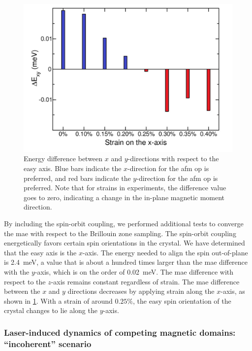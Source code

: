 \begin{figure}
\centering
\includegraphics[width=\textwidth]{./gfx/ch6/equilibriumtheory.pdf}
\caption[Energy difference between $x$ and $y$-directions with respect to the easy axis]{
\label{cmb-fig:equilibriumtheory}
Energy difference between $x$ and $y$-directions with respect to the easy axis.
Blue bars indicate the $x$-direction for the \gls{afm} \gls{op} is preferred, and red bars indicate the $y$-direction for the \gls{afm} \gls{op} is preferred.
Note that for strains in experiments, the difference value goes to zero, indicating a change in the in-plane magnetic moment direction.
}
\end{figure}

By including the spin-orbit coupling, we performed additional tests to converge the \gls{mae} with respect to the Brillouin zone sampling.
The spin-orbit coupling energetically favors certain spin orientations in the crystal.
We have determined that the  easy axis is the $x$-axis.
The energy needed to align the spin out-of-plane is \qty{2.4}{meV}, a value that is about a hundred times larger than the \gls{mae} difference with the $y$-axis, which is on the order of \qty{0.02}{meV}.
The \gls{mae} difference with respect  to the $z$-axis remains constant regardless of strain.
The \gls{mae} difference between the $x$ and $y$ directions decreases by applying strain along the $x$-axis, as shown in \cref{cmb-fig:equilibriumtheory}.
With a strain of around $0.25 \%$, the easy spin orientation of the crystal changes to lie along the $y$-axis.

\subsubsection{Laser-induced dynamics of competing magnetic domains: ``incoherent'' scenario}\label{cmb-sec:fluctuations}

